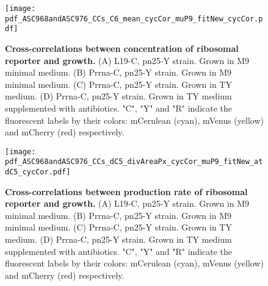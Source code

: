\begin{figure}
    \centering
    \texttt{[image: pdf\_ASC968andASC976\_CCs\_C6\_mean\_cycCor\_muP9\_fitNew\_cycCor.pdf]}
    \caption{ 
        \textbf{Cross-correlations between concentration of ribosomal reporter and growth.}
        (A) L19-C, pn25-Y strain. Grown in M9 minimal medium.
        (B) Prrna-C, pn25-Y strain. Grown in M9 minimal medium.
        (C) Prrna-C, pn25-Y strain. Grown in TY medium.
        (D) Prrna-C, pn25-Y strain. Grown in TY medium supplemented with antibiotics.
        "C", "Y" and "R" indicate the fluorescent labels by their colors: mCerulean (cyan), mVenus (yellow) and mCherry (red) respectively.
    }
    \label{fig:ribo:CCsEmuYRibo}
\end{figure}

\begin{figure}
    \centering
    \texttt{[image: pdf\_ASC968andASC976\_CCs\_dC5\_divAreaPx\_cycCor\_muP9\_fitNew\_atdC5\_cycCor.pdf]}
    \caption{ 
        \textbf{Cross-correlations between production rate of ribosomal reporter and growth.}
        (A) L19-C, pn25-Y strain. Grown in M9 minimal medium.
        (B) Prrna-C, pn25-Y strain. Grown in M9 minimal medium.
        (C) Prrna-C, pn25-Y strain. Grown in TY medium.
        (D) Prrna-C, pn25-Y strain. Grown in TY medium supplemented with antibiotics.
        "C", "Y" and "R" indicate the fluorescent labels by their colors: mCerulean (cyan), mVenus (yellow) and mCherry (red) respectively.
    }
    \label{fig:ribo:CCsPmuYRibo}
\end{figure}



